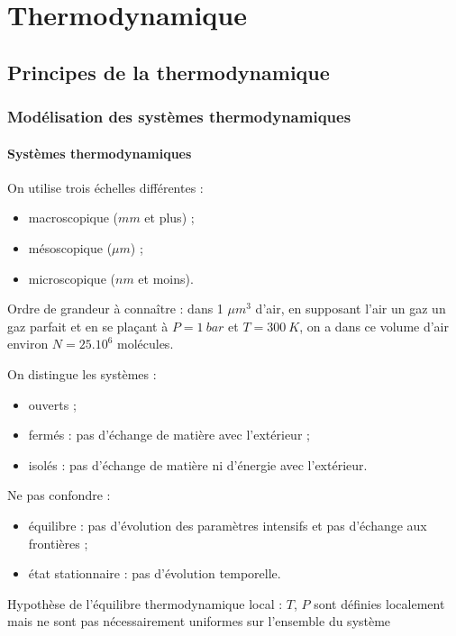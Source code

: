\documentclass[french]{book}
\theoremstyle{plain}
\theoremstyle{definition}
\theoremstyle{remark}
\begin{document}
\part{Thermodynamique}
\chapter{Principes de la thermodynamique}
\localtableofcontents
\section{Modélisation des systèmes thermodynamiques}

\subsection{Systèmes thermodynamiques}
On utilise trois échelles différentes :
\begin{itemize}
	\item macroscopique ($mm$ et plus) ;
	\item mésoscopique ($\mu m$) ;
	\item microscopique ($nm$ et moins).
\end{itemize}
Ordre de grandeur à connaître : dans 1 $\mu m^3$ d'air, en supposant l'air un gaz un gaz parfait et en se plaçant à $P=1\ bar$ et $T=300 \ K$, on a dans ce volume d'air environ $N=25.10^6$ molécules. \\ \par
On distingue les systèmes : 
\begin{itemize}
	\item ouverts ;
	\item fermés : pas d'échange de matière avec l'extérieur ;
	\item isolés : pas d'échange de matière ni d'énergie avec l'extérieur.
\end{itemize} \par
Ne pas confondre :
\begin{itemize}
	\item équilibre : pas d'évolution des paramètres intensifs et pas d'échange aux frontières ; 
	\item état stationnaire : pas d'évolution temporelle.
\end{itemize} \par 
Hypothèse de l'équilibre thermodynamique local : $T$, $P$ sont définies localement mais ne sont pas nécessairement uniformes sur l'ensemble du système
\end{document}
